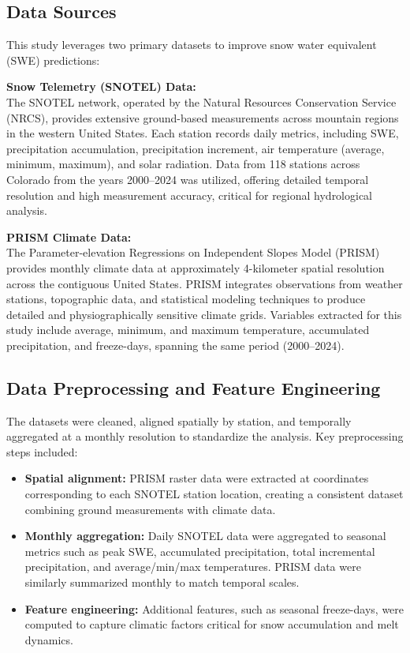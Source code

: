 \documentclass{article}
\begin{document}
\subsection{Data Sources}

This study leverages two primary datasets to improve snow water equivalent (SWE) predictions:

\textbf{Snow Telemetry (SNOTEL) Data:} \\
The SNOTEL network, operated by the Natural Resources Conservation Service (NRCS), provides extensive ground-based measurements across mountain regions in the western United States. Each station records daily metrics, including SWE, precipitation accumulation, precipitation increment, air temperature (average, minimum, maximum), and solar radiation. Data from 118 stations across Colorado from the years 2000--2024 was utilized, offering detailed temporal resolution and high measurement accuracy, critical for regional hydrological analysis.

\textbf{PRISM Climate Data:} \\
The Parameter-elevation Regressions on Independent Slopes Model (PRISM) provides monthly climate data at approximately 4-kilometer spatial resolution across the contiguous United States. PRISM integrates observations from weather stations, topographic data, and statistical modeling techniques to produce detailed and physiographically sensitive climate grids. Variables extracted for this study include average, minimum, and maximum temperature, accumulated precipitation, and freeze-days, spanning the same period (2000--2024).

\subsection{Data Preprocessing and Feature Engineering}

The datasets were cleaned, aligned spatially by station, and temporally aggregated at a monthly resolution to standardize the analysis. Key preprocessing steps included:

\begin{itemize}
    \item \textbf{Spatial alignment:} PRISM raster data were extracted at coordinates corresponding to each SNOTEL station location, creating a consistent dataset combining ground measurements with climate data.
    \item \textbf{Monthly aggregation:} Daily SNOTEL data were aggregated to seasonal metrics such as peak SWE, accumulated precipitation, total incremental precipitation, and average/min/max temperatures. PRISM data were similarly summarized monthly to match temporal scales.
    \item \textbf{Feature engineering:} Additional features, such as seasonal freeze-days, were computed to capture climatic factors critical for snow accumulation and melt dynamics.
\end{itemize}
\end{document}
